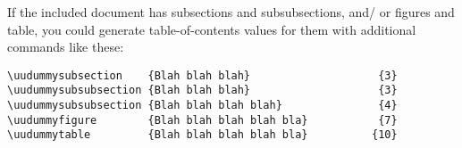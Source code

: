If the included document has subsections and subsubsections, and\slash
or figures and table, you could generate table-of-contents values for
them with additional commands like these:
%
\begin{verbatim}
\uudummysubsection    {Blah blah blah}                    {3}
\uudummysubsubsection {Blah blah blah}                    {3}
\uudummysubsubsection {Blah blah blah blah}               {4}
\uudummyfigure        {Blah blah blah blah bla}           {7}
\uudummytable         {Blah blah blah blah bla}          {10}
\end{verbatim}

%
%

%
%
%
